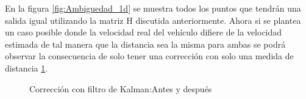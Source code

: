 En la figura \ref{fig:Ambiguedad_1d} se muestra todos los puntos que tendrán una salida igual utilizando la matriz H discutida anteriormente. Ahora si se plantea un caso posible donde la velocidad real del vehículo difiere de la velocidad estimada de tal manera que la distancia sea la misma para ambas se podrá observar la consecuencia de solo tener una corrección con solo una medida de distancia \ref{fig:Corrción2car}. 

\begin{figure}[!htb]
  \begin{center}
    \caption{Corrección con filtro de Kalman:Antes y después}
    \label{fig:Corrción2car}
  \end{center}
\end{figure}